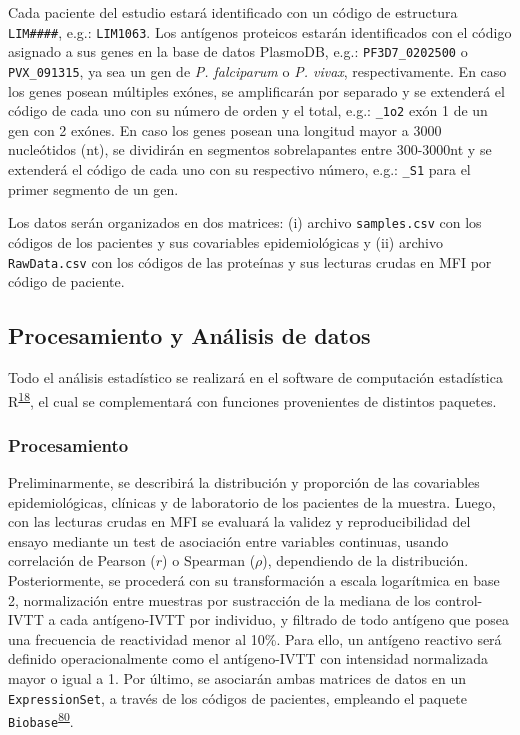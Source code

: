 \documentclass[]{article}
\begin{document}
Cada paciente del estudio estará identificado con un código de
estructura \texttt{LIM\#\#\#\#}, e.g.: \texttt{LIM1063}. Los antígenos
proteicos estarán identificados con el código asignado a sus genes en la
base de datos PlasmoDB, e.g.: \texttt{PF3D7\_0202500} o
\texttt{PVX\_091315}, ya sea un gen de \emph{P. falciparum} o \emph{P.
vivax}, respectivamente. En caso los genes posean múltiples exónes, se
amplificarán por separado y se extenderá el código de cada uno con su
número de orden y el total, e.g.: \texttt{\_1o2} exón 1 de un gen con 2
exónes. En caso los genes posean una longitud mayor a 3000 nucleótidos
(nt), se dividirán en segmentos sobrelapantes entre 300-3000nt y se
extenderá el código de cada uno con su respectivo número, e.g.:
\texttt{\_S1} para el primer segmento de un gen.

Los datos serán organizados en dos matrices: (i) archivo
\texttt{samples.csv} con los códigos de los pacientes y sus covariables
epidemiológicas y (ii) archivo \texttt{RawData.csv} con los códigos de
las proteínas y sus lecturas crudas en MFI por código de paciente.

\hypertarget{procanal}{\subsection{Procesamiento y Análisis de
datos}\label{procanal}}

Todo el análisis estadístico se realizará en el software de computación
estadística R\textsuperscript{\protect\hyperlink{ref-R}{18}}, el cual se
complementará con funciones provenientes de distintos paquetes.

\subsubsection{Procesamiento}\label{procesamiento}

Preliminarmente, se describirá la distribución y proporción de las
covariables epidemiológicas, clínicas y de laboratorio de los pacientes
de la muestra. Luego, con las lecturas crudas en MFI se evaluará la
validez y reproducibilidad del ensayo mediante un test de asociación
entre variables continuas, usando correlación de Pearson (\(r\)) o
Spearman (\(\rho\)), dependiendo de la distribución. Posteriormente, se
procederá con su transformación a escala logarítmica en base 2,
normalización entre muestras por sustracción de la mediana de los
control-IVTT a cada antígeno-IVTT por individuo, y filtrado de todo
antígeno que posea una frecuencia de reactividad menor al 10\%. Para
ello, un antígeno reactivo será definido operacionalmente como el
antígeno-IVTT con intensidad normalizada mayor o igual a 1. Por último,
se asociarán ambas matrices de datos en un \texttt{ExpressionSet}, a
través de los códigos de pacientes, empleando el paquete
\texttt{Biobase}\textsuperscript{\protect\hyperlink{ref-Biobase}{80}}.
\end{document}
